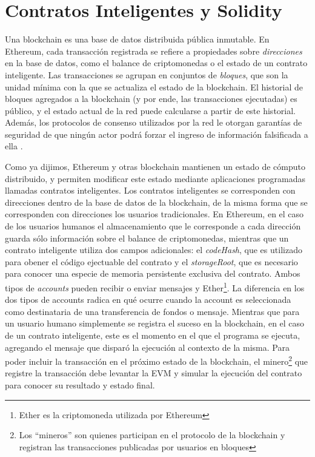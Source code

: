\section{Contratos Inteligentes y Solidity}
Una blockchain es una base de datos distribuida pública inmutable.
En Ethereum, cada transacción registrada se refiere a propiedades sobre \textit{direcciones} en la base de datos, como el balance de criptomonedas o el estado de un contrato inteligente.
Las transacciones se agrupan en conjuntos de \textit{bloques}, que son la unidad mínima con la que se actualiza el estado de la blockchain.
El historial de bloques agregados a la blockchain (y por ende, las transacciones ejecutadas) es público, y el estado actual de la red puede calcularse a partir de este historial.
Además, los protocolos de consenso utilizados por la red le otorgan garantías de seguridad de que ningún actor podrá forzar el ingreso de información falsificada a ella \cite{protocolos-consenso}.

Como ya dijimos, Ethereum y otras blockchain mantienen un estado de cómputo distribuido, y permiten modificar este estado mediante aplicaciones programadas llamadas contratos inteligentes.
Los contratos inteligentes se corresponden con direcciones dentro de la base de datos de la blockchain, de la misma forma que se corresponden con direcciones los usuarios tradicionales.
En Ethereum, en el caso de los usuarios humanos el almacenamiento que le corresponde a cada dirección guarda sólo información sobre el balance de criptomonedas, mientras que un contrato inteligente utiliza dos campos adicionales: el \textit{codeHash}, que es utilizado para obener el código ejectuable del contrato y el \textit{storageRoot}, que es necesario para conocer una especie de memoria persistente exclusiva del contrato.
Ambos tipos de \textit{accounts} pueden recibir o enviar mensajes y Ether\footnote{Ether es la criptomoneda utilizada por Ethereum}.
La diferencia en los dos tipos de accounts radica en qué ocurre cuando la account es seleccionada como destinataria de una transferencia de fondos o mensaje.
Mientras que para un usuario humano simplemente se registra el suceso en la blockchain, en el caso de un contrato inteligente, este es el momento en el que el programa se ejecuta, agregando el mensaje que disparó la ejecución al contexto de la misma.
Para poder incluir la transacción en el próximo estado de la blockchain, el minero\footnote{Los ``mineros'' son quienes participan en el protocolo de la blockchain y registran las transacciones publicadas por usuarios en bloques} que registre la transacción debe levantar la EVM y simular la ejecución del contrato para conocer su  resultado y estado final.

